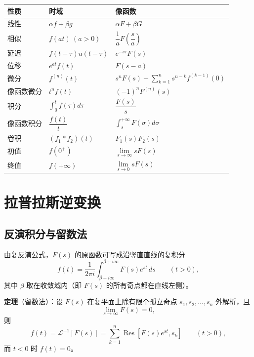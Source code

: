 \begin{center}
\begin{tabular}{@{}lll@{}}
\toprule
性质 & 时域 & 像函数 \\
\midrule
线性 & \(\alpha f+\beta g\) & \(\alpha F+\beta G\) \\
相似 & \(f(at)\ (a>0)\) & \(\dfrac{1}{a}F\!\left(\dfrac{s}{a}\right)\) \\
延迟 & \(f(t-\tau)u(t-\tau)\) & \(e^{-s\tau}F(s)\) \\
位移 & \(e^{at}f(t)\) & \(F(s-a)\) \\
微分 & \(f^{(n)}(t)\) & \(s^nF(s)-\sum\limits_{k=1}^{n}s^{n-k}f^{(k-1)}(0)\) \\
像函数微分 & \(t^nf(t)\) & \((-1)^nF^{(n)}(s)\) \\
积分 & \(\displaystyle\int_0^tf(\tau)d\tau\) & \(\dfrac{F(s)}{s}\) \\
像函数积分 & \(\dfrac{f(t)}{t}\) & \(\displaystyle\int_s^{+\infty}F(\sigma)d\sigma\) \\
卷积 & \((f_1*f_2)(t)\) & \(F_1(s)F_2(s)\) \\
初值 & \(f(0^+)\) & \(\lim\limits_{s\to\infty}sF(s)\) \\
终值 & \(f(+\infty)\) & \(\lim\limits_{s\to0}sF(s)\) \\
\bottomrule
\end{tabular}
\end{center}

\section{拉普拉斯逆变换}

\subsection{反演积分与留数法}

由复反演公式，\(F(s)\) 的原函数可写成沿竖直直线的复积分
\[
f(t)=\frac{1}{2\pi i}\int_{\beta-i\infty}^{\beta+i\infty}F(s)e^{st}\,ds
\qquad(t>0),
\]
其中 \(\beta\) 取在收敛域内（即 \(F(s)\) 的所有奇点都在直线左侧）。

\textbf{定理}（留数法）：设 \(F(s)\) 在复平面上除有限个孤立奇点 \(s_1,s_2,\dots,s_n\) 外解析，且
\[
\lim_{s\to\infty}F(s)=0,
\]
则
\begin{equation}
f(t)=\mathscr{L}^{-1}[F(s)]=\sum_{k=1}^{n}\operatorname{Res}\left[F(s)e^{st},s_k\right]
\qquad(t>0),
\label{eq:invres}
\end{equation}
而 \(t<0\) 时 \(f(t)=0\)。

